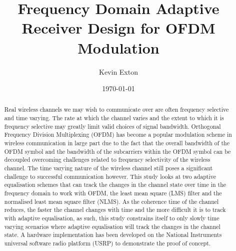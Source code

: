 \documentclass[a4paper]{report}
\title{Frequency Domain Adaptive Receiver Design for OFDM Modulation}
\author{Kevin Exton}
\date{\today}
\begin{document}
\maketitle
\renewcommand{\abstractname}{Executive Summary}
\begin{abstract}
Real wireless channels we may wish to communicate over %
are often frequency selective and time varying. The rate %
at which the channel varies and the extent to which it %
is frequency selective may greatly limit valid choices of %
signal bandwidth. Orthogonal Frequency Division Multiplexing %
(OFDM) has become a popular modulation scheme in wireless %
communication in large part due to the fact that the overall %
bandwidth of the OFDM symbol and the bandwidth of the %
subcarriers within the OFDM symbol can be decoupled overcoming %
challenges related to frequency selectivity of the wireless channel. %
The time varying nature of the wireless channel still poses a significant %
challenge to successful communication however. This study %
looks at two adaptive equalisation schemes that can track %
the changes in the channel state over time in the frequency %
domain to work with OFDM, the least mean square (LMS) %
filter and the normalised least mean square filter (NLMS). As the %
coherence time of the channel reduces, the faster the channel %
changes with time and the more difficult it is to track with %
adaptive equalisation, as such, this study constrains itself to %
only slowly time varying scenarios where adaptive equalisation %
will track the changes in the channel state. A hardware implementation %
has been developed on the National Instruments universal software %
radio platform (USRP) to demonstrate the proof of concept.
\end{abstract}
\tableofcontents







\newpage
{}


\end{document}
